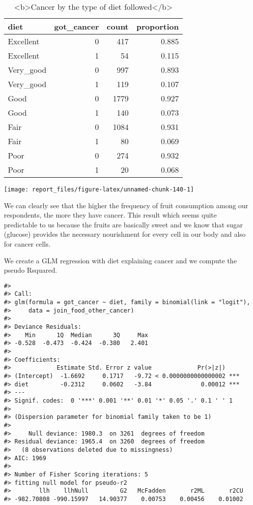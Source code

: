 \documentclass[
]{article}
\begin{document}
\begin{table}

\caption{\label{tab:unnamed-chunk-139}<b>Cancer by the type of diet followed</b>}
\centering
\begin{tabular}[t]{l|r|r|r}
\hline
diet & got\_cancer & count & proportion\\
\hline
Excellent & 0 & 417 & 0.885\\
\hline
Excellent & 1 & 54 & 0.115\\
\hline
Very\_good & 0 & 997 & 0.893\\
\hline
Very\_good & 1 & 119 & 0.107\\
\hline
Good & 0 & 1779 & 0.927\\
\hline
Good & 1 & 140 & 0.073\\
\hline
Fair & 0 & 1084 & 0.931\\
\hline
Fair & 1 & 80 & 0.069\\
\hline
Poor & 0 & 274 & 0.932\\
\hline
Poor & 1 & 20 & 0.068\\
\hline
\end{tabular}
\end{table}

\begin{center}\texttt{[image: report\_files/figure-latex/unnamed-chunk-140-1]} \end{center}

We can clearly see that the higher the frequency of fruit consumption
among our respondents, the more they have cancer. This result which
seems quite predictable to us because the fruits are basically sweet and
we know that sugar (glucose) provides the necessary nourishment for
every cell in our body and also for cancer cells.

We create a GLM regression with diet explaining cancer and we compute
the pseudo Rsquared.

\begin{verbatim}
#> 
#> Call:
#> glm(formula = got_cancer ~ diet, family = binomial(link = "logit"), 
#>     data = join_food_other_cancer)
#> 
#> Deviance Residuals: 
#>    Min      1Q  Median      3Q     Max  
#> -0.528  -0.473  -0.424  -0.380   2.401  
#> 
#> Coefficients:
#>             Estimate Std. Error z value             Pr(>|z|)    
#> (Intercept)  -1.6692     0.1717   -9.72 < 0.0000000000000002 ***
#> diet         -0.2312     0.0602   -3.84              0.00012 ***
#> ---
#> Signif. codes:  0 '***' 0.001 '**' 0.01 '*' 0.05 '.' 0.1 ' ' 1
#> 
#> (Dispersion parameter for binomial family taken to be 1)
#> 
#>     Null deviance: 1980.3  on 3261  degrees of freedom
#> Residual deviance: 1965.4  on 3260  degrees of freedom
#>   (8 observations deleted due to missingness)
#> AIC: 1969
#> 
#> Number of Fisher Scoring iterations: 5
#> fitting null model for pseudo-r2
#>        llh    llhNull         G2   McFadden       r2ML       r2CU 
#> -982.70808 -990.15997   14.90377    0.00753    0.00456    0.01002
\end{verbatim}
\end{document}

